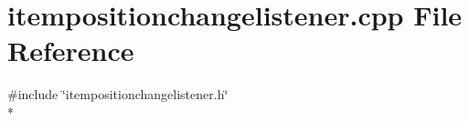 \section{itempositionchangelistener.\+cpp File Reference}
\label{bk3_2curve_2itempositionchangelistener_8cpp}
{\ttfamily \#include \char`\"{}itempositionchangelistener.\+h\char`\"{}}\\*
